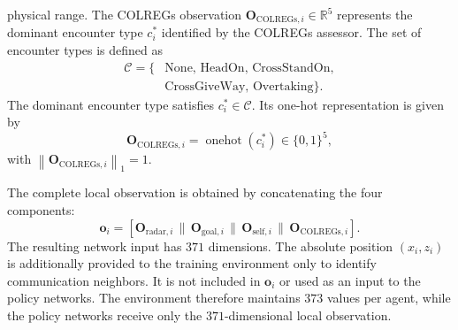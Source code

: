 \documentclass[final,5p,times,twocolumn]{elsarticle}
\begin{document}
{physical range.
The COLREGs observation
$\mathbf{O}_{\mathrm{COLREGs},i}\in\mathbb{R}^{5}$
represents the dominant encounter type $c_i^*$ identified by the
COLREGs assessor. The set of encounter types is defined as
\begin{equation}
\begin{aligned}
\mathcal{C}=\{&
\mathrm{None},\,
\mathrm{HeadOn},\,
\mathrm{CrossStandOn},\\
&
\mathrm{CrossGiveWay},\,
\mathrm{Overtaking}
\}.
\end{aligned}
\end{equation}
The dominant encounter type satisfies $c_i^*\in\mathcal{C}$.
Its one-hot representation is given by
\begin{equation}
\mathbf{O}_{\mathrm{COLREGs},i}
=\operatorname{onehot}(c_i^*)
\in\{0,1\}^{5},
\end{equation}
with $\left\|
\mathbf{O}_{\mathrm{COLREGs},i}
\right\|_1=1$.

The complete local observation is obtained by concatenating the four
components:
\begin{equation}
\mathbf{o}_i
=
\left[
\mathbf{O}_{\mathrm{radar},i}
\,\|\, 
\mathbf{O}_{\mathrm{goal},i}
\,\|\,
\mathbf{O}_{\mathrm{self},i}
\,\|\,
\mathbf{O}_{\mathrm{COLREGs},i}
\right].
\end{equation}
The resulting network input has $371$ dimensions.
The absolute position $(x_i,z_i)$ is additionally provided to the
training environment only to identify communication neighbors. It is not
included in $\mathbf{o}_i$ or used as an input to the policy networks.
The environment therefore maintains $373$ values per agent, while the
policy networks receive only the $371$-dimensional local observation.
}

\end{document}
